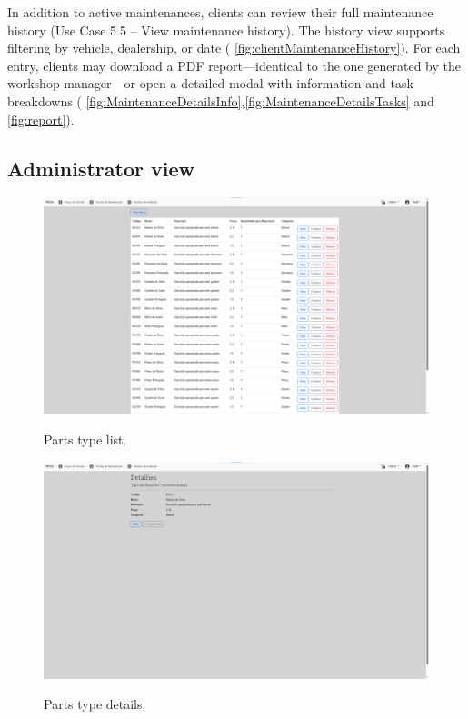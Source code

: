In addition to active maintenances, clients can review their full maintenance history (Use Case 5.5 – View maintenance history). The history view supports filtering by vehicle, dealership, or date ( \ref{fig:clientMaintenanceHistory}). For each entry, clients may download a PDF report—identical to the one generated by the workshop manager—or open a detailed modal with information and task breakdowns ( \ref{fig:MaintenanceDetailsInfo},\ref{fig:MaintenanceDetailsTasks} and \ref{fig:report}).



\subsection{Administrator view}


\begin{figure}[h]
  \caption{Parts type list.}
  \centering
  \includegraphics[width=\textwidth]{figs/Implementation/dealershipAdmin/partsIndex}
  \label{fig:partsIndex}
\end{figure}


\begin{figure}[h]
  \caption{Parts type details.}
  \centering
  \includegraphics[width=\textwidth]{figs/Implementation/dealershipAdmin/partsDetails}
  \label{fig:partsDetails}
\end{figure}

